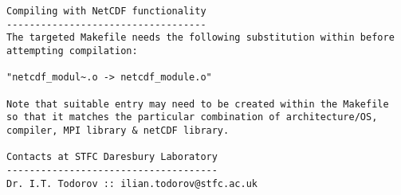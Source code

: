 \begin{verbatim}
Compiling with NetCDF functionality
-----------------------------------
The targeted Makefile needs the following substitution within before
attempting compilation:

"netcdf_modul~.o -> netcdf_module.o"

Note that suitable entry may need to be created within the Makefile
so that it matches the particular combination of architecture/OS,
compiler, MPI library & netCDF library.

Contacts at STFC Daresbury Laboratory
-------------------------------------
Dr. I.T. Todorov :: ilian.todorov@stfc.ac.uk
\end{verbatim}
